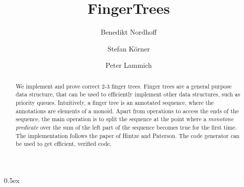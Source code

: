 \documentclass[11pt,a4paper]{article}
\begin{document}
\title{FingerTrees}
\author{Benedikt Nordhoff \and Stefan K\"orner \and Peter Lammich}


\maketitle

\begin{abstract}
  We implement and prove correct 2-3 finger trees.
  Finger trees are a general purpose data structure, that can be used to
  efficiently implement other data structures, such as priority queues.
  Intuitively, a finger tree is an annotated sequence, where the annotations are
  elements of a monoid. Apart from operations to access the ends of the sequence,
  the main operation is to split the sequence at the point where a 
  {\em monotone predicate} over the sum of the left part of the sequence 
  becomes true for the first time.
  The implementation follows the paper of Hintze and Paterson\cite{HiPa06}.
  The code generator can be used to get efficient, verified code.
\end{abstract}

\tableofcontents

\parindent 0pt\parskip 0.5ex





\end{document}

